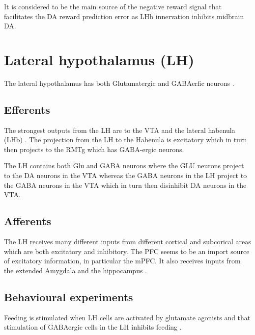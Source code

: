 \documentclass[12pt,a4paper]{article}
\begin{document}
It is considered to be the main source of the negative reward signal that facilitates the DA reward prediction error as LHb innervation inhibits midbrain DA.\citep{Shen2012}\citep{Shabel2012}\citep{Matsumoto2007}\citep{Barrot2012} 





\section{Lateral hypothalamus (LH)}

The lateral hypothalamus has both Glutamatergic and GABAerfic neurons \citep{Stanley2011}.

\subsection{Efferents}

The strongest outputs from the LH are to the VTA and the lateral habenula (LHb) \citep{Stuber2016}. 
The projection from the LH to the Habenula is excitatory \citep{Poller2013} which in turn then projects to the RMTg which has GABA-ergic neurons.

The LH contains both Glu and GABA neurons where the GLU neurons project to the DA neurons in the VTA whereas the GABA neurons in the LH project to the GABA neurons in the VTA which in turn then disinhibit DA neurons in the VTA. 


\subsection{Afferents}

The LH receives many different inputs from different cortical and subcorical areas which are both excitatory and inhibitory. The PFC seems to be an import source of excitatory information, in particular the mPFC. It also receives inputs from the extended Amygdala and the hippocampus \citep{Stuber2016}.

\subsection{Behavioural experiments}

Feeding is stimulated when LH cells are activated by glutamate
agonists \citep{stanley93} and that stimulation of GABAergic cells in the LH inhibits feeding \citep{Stanley2011}.
\end{document}
